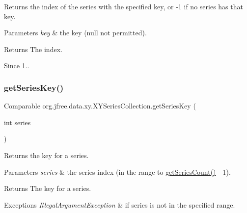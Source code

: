 Returns the index of the series with the specified key, or -\/1 if no series has that key.


\begin{DoxyParams}{Parameters}
{\em key} & the key ({\ttfamily null} not permitted).\\
\hline
\end{DoxyParams}
\begin{DoxyReturn}{Returns}
The index.
\end{DoxyReturn}
\begin{DoxySince}{Since}
1.. 
\end{DoxySince}
\mbox{\label{classorg_1_1jfree_1_1data_1_1xy_1_1_x_y_series_collection_a187f5a716fa918fcbfaa314b98aa9977}} 
\subsubsection{\texorpdfstring{get\+Series\+Key()}{getSeriesKey()}}
{\footnotesize\ttfamily Comparable org.\+jfree.\+data.\+xy.\+X\+Y\+Series\+Collection.\+get\+Series\+Key (\begin{DoxyParamCaption}\item[{int}]{series }\end{DoxyParamCaption})}

Returns the key for a series.


\begin{DoxyParams}{Parameters}
{\em series} & the series index (in the range {} to {\ttfamily \mbox{\hyperlink{classorg_1_1jfree_1_1data_1_1xy_1_1_x_y_series_collection_ab50b1e302d11ddf25ef86dba1b2d4ffe}{get\+Series\+Count()}} -\/ 1}).\\
\hline
\end{DoxyParams}
\begin{DoxyReturn}{Returns}
The key for a series.
\end{DoxyReturn}

\begin{DoxyExceptions}{Exceptions}
{\em Illegal\+Argument\+Exception} & if {\ttfamily series} is not in the specified range. \\
\hline
\end{DoxyExceptions}


